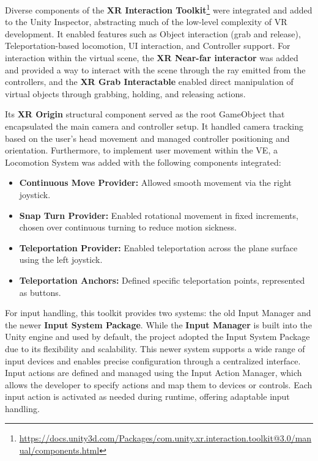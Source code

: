 Diverse components of the \textbf{\gls{XR} Interaction Toolkit}\footnote{\url{https://docs.unity3d.com/Packages/com.unity.xr.interaction.toolkit@3.0/manual/components.html}} were integrated and added to the Unity Inspector, abstracting much of the low-level complexity of \gls{VR} development. It enabled features such 
as Object interaction (grab and release), Teleportation-based locomotion, \gls{UI} interaction, and Controller support.
For interaction within the virtual scene, the \textbf{\gls{XR} Near-far interactor} was added and provided a way to interact with the scene through the ray emitted from the controllers, and the \textbf{\gls{XR} Grab Interactable} enabled direct manipulation of virtual objects through grabbing, holding, and releasing actions.

Its \textbf{\gls{XR} Origin} structural component served as the root GameObject that encapsulated the main camera and controller setup. 
It handled camera tracking based on the user's head movement and managed controller positioning and orientation. 
Furthermore, to implement user movement within the \gls{VE}, a Locomotion System was added with the following components integrated: 

\begin{itemize}
\item{\textbf{Continuous Move Provider:}  Allowed smooth movement via the right joystick.}
\item{\textbf{Snap Turn Provider:}  Enabled rotational movement in fixed increments, chosen over continuous turning to reduce motion sickness.}
\item{\textbf{Teleportation Provider:} Enabled teleportation across the plane surface using the left joystick.}
\item{\textbf{Teleportation Anchors:} Defined specific teleportation points, represented as buttons.}
\end{itemize}

For input handling, this toolkit provides two systems: the old Input Manager and the newer \textbf{Input System Package}. 
While the \textbf{Input Manager} is built into the Unity engine and used by default, the project adopted the Input System Package due to its flexibility and scalability. 
This newer system supports a wide range of input devices and enables precise configuration through a centralized interface. Input actions are defined and managed using the Input Action Manager, which allows the developer to specify actions and map them to devices or controls. 
Each input action is activated as needed during runtime, offering adaptable input handling.



